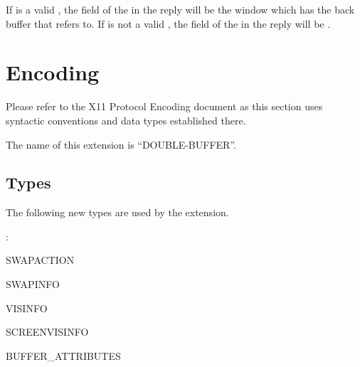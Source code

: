 If  is a valid , the
 field of the  in the reply will
be the window which has the back buffer that
 refers to.  If 
is not a valid , the  field of
the  in the reply will be .

\section{Encoding}

Please refer to the X11 Protocol Encoding document as this section uses
syntactic conventions and data types established there.

The name of this extension is ``DOUBLE-BUFFER''.

\subsection{Types}

The following new types are used by the extension.

: 
\vspace{5mm}

\begin{etypedef}{SWAPACTION}
\end{etypedef}

\begin{etypedef}{SWAPINFO}
\end{etypedef}

\begin{etypedef}{VISINFO}
\end{etypedef}

\begin{etypedef}{SCREENVISINFO}
\end{etypedef}

\begin{etypedef}{BUFFER\_ATTRIBUTES}
\end{etypedef}


